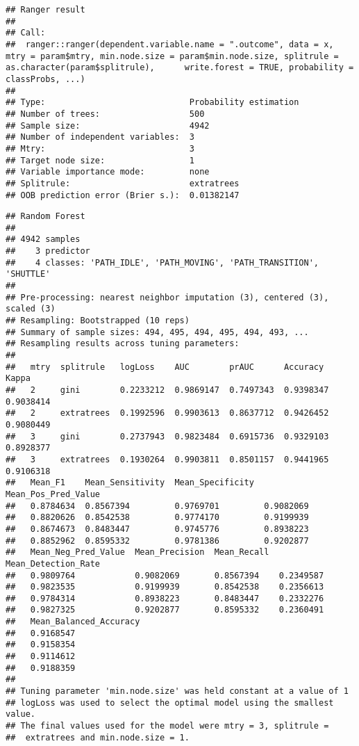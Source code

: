 \documentclass[]{article}
\begin{document}
\begin{verbatim}
## Ranger result
## 
## Call:
##  ranger::ranger(dependent.variable.name = ".outcome", data = x,      mtry = param$mtry, min.node.size = param$min.node.size, splitrule = as.character(param$splitrule),      write.forest = TRUE, probability = classProbs, ...) 
## 
## Type:                             Probability estimation 
## Number of trees:                  500 
## Sample size:                      4942 
## Number of independent variables:  3 
## Mtry:                             3 
## Target node size:                 1 
## Variable importance mode:         none 
## Splitrule:                        extratrees 
## OOB prediction error (Brier s.):  0.01382147
\end{verbatim}

\begin{verbatim}
## Random Forest 
## 
## 4942 samples
##    3 predictor
##    4 classes: 'PATH_IDLE', 'PATH_MOVING', 'PATH_TRANSITION', 'SHUTTLE' 
## 
## Pre-processing: nearest neighbor imputation (3), centered (3), scaled (3) 
## Resampling: Bootstrapped (10 reps) 
## Summary of sample sizes: 494, 495, 494, 495, 494, 493, ... 
## Resampling results across tuning parameters:
## 
##   mtry  splitrule   logLoss    AUC        prAUC      Accuracy   Kappa    
##   2     gini        0.2233212  0.9869147  0.7497343  0.9398347  0.9038414
##   2     extratrees  0.1992596  0.9903613  0.8637712  0.9426452  0.9080449
##   3     gini        0.2737943  0.9823484  0.6915736  0.9329103  0.8928377
##   3     extratrees  0.1930264  0.9903811  0.8501157  0.9441965  0.9106318
##   Mean_F1    Mean_Sensitivity  Mean_Specificity  Mean_Pos_Pred_Value
##   0.8784634  0.8567394         0.9769701         0.9082069          
##   0.8820626  0.8542538         0.9774170         0.9199939          
##   0.8674673  0.8483447         0.9745776         0.8938223          
##   0.8852962  0.8595332         0.9781386         0.9202877          
##   Mean_Neg_Pred_Value  Mean_Precision  Mean_Recall  Mean_Detection_Rate
##   0.9809764            0.9082069       0.8567394    0.2349587          
##   0.9823535            0.9199939       0.8542538    0.2356613          
##   0.9784314            0.8938223       0.8483447    0.2332276          
##   0.9827325            0.9202877       0.8595332    0.2360491          
##   Mean_Balanced_Accuracy
##   0.9168547             
##   0.9158354             
##   0.9114612             
##   0.9188359             
## 
## Tuning parameter 'min.node.size' was held constant at a value of 1
## logLoss was used to select the optimal model using the smallest value.
## The final values used for the model were mtry = 3, splitrule =
##  extratrees and min.node.size = 1.
\end{verbatim}
\end{document}
